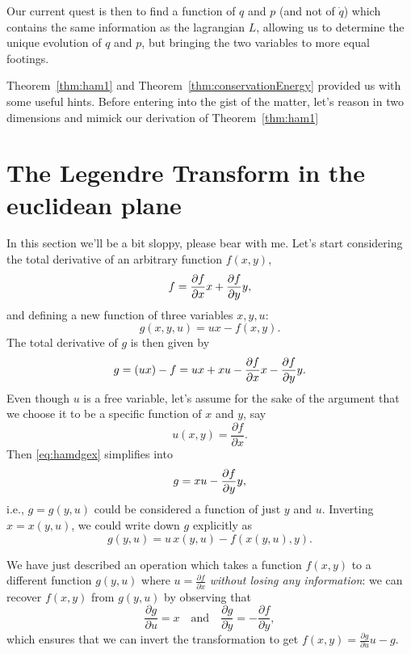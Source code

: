 \documentclass[english,fontsize=11pt,paper=a5,oneside]{scrbook}
\let\d\relax
\newcommand{\d}{\mathrm{d}}
\theoremstyle{definition}
\begin{document}
Our current quest is then to find a function of $q$ and $p$ (and not of $\dot q$) which contains the same information as the lagrangian $L$, allowing us to determine the unique evolution of $q$ and $p$, but bringing the two variables to more equal footings.

Theorem~\ref{thm:ham1} and Theorem~\ref{thm:conservationEnergy} provided us with some useful hints.
Before entering into the gist of the matter, let's reason in two dimensions and mimick our derivation of Theorem~\ref{thm:ham1}

\section{The Legendre Transform in the euclidean plane}

In this section we'll be a bit sloppy, please bear with me.
%
Let's start considering the total derivative of an arbitrary function $f(x,y)$,
\begin{equation}
  \d f = \frac{\partial f}{\partial x} \d x + \frac{\partial f}{\partial y} \d y,
\end{equation}
and defining a new function of three variables $x,y,u$:
\begin{equation}
  g(x,y,u) = ux - f(x,y).
\end{equation}
The total derivative of $g$ is then given by
\begin{equation}\label{eq:hamdgex}
  \d g = \d(ux) - \d f = u\d x + x \d u - \frac{\partial f}{\partial x} \d x - \frac{\partial f}{\partial y} \d y.
\end{equation}
Even though $u$ is a free variable, let's assume for the sake of the argument that we choose it to be a specific function of $x$  and $y$, say
\begin{equation}
  u(x,y) = \frac{\partial f}{\partial x}.
\end{equation}
Then \eqref{eq:hamdgex} simplifies into
\begin{equation}
  \d g = x \d u - \frac{\partial f}{\partial y} \d y,
\end{equation}
i.e., $g=g(y,u)$ could be considered a function of just $y$ and $u$.
Inverting $x = x(y,u)$, we could write down $g$ explicitly as
\begin{equation}
  g(y,u) = u\, x(y,u) - f(x(y, u), y).
\end{equation}

We have just described an operation which takes a function $f(x,y)$ to a different function $g(y,u)$ where $u = \frac{\partial f}{\partial x}$ \emph{without losing any information}: we can recover $f(x,y)$ from $g(y,u)$ by observing that
\begin{equation}
  \frac{\partial g}{\partial u} = x
  \quad\mbox{and}\quad
  \frac{\partial g}{\partial y} = - \frac{\partial f}{\partial y},
\end{equation}
which ensures that we can invert the transformation to get $f(x,y) = \frac{\partial g}{\partial u}u - g$.
\end{document}
